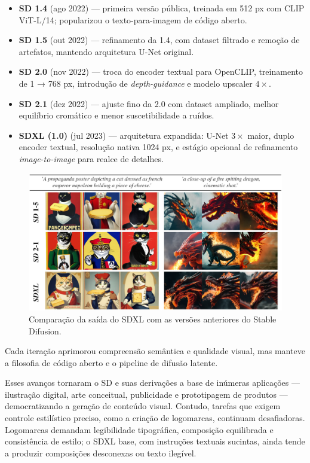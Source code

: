 \documentclass[12pt, %
openright, 
oneside, %
a4paper,    %
brazil]{facom-ufu-abntex2}
\begin{document}
\begin{itemize}
  \item \textbf{SD 1.4} (ago 2022) — primeira versão pública, treinada em 512 px com CLIP ViT-L/14; popularizou o texto-para-imagem de código aberto.  
  \item \textbf{SD 1.5} (out 2022) — refinamento da 1.4, com dataset filtrado e remoção de artefatos, mantendo arquitetura U-Net original.  
  \item \textbf{SD 2.0} (nov 2022) — troca do encoder textual para OpenCLIP, treinamento de 1 → 768 px, introdução de \emph{depth-guidance} e modelo upscaler \(4\times\).  
  \item \textbf{SD 2.1} (dez 2022) — ajuste fino da 2.0 com dataset ampliado, melhor equilíbrio cromático e menor suscetibilidade a ruídos.  
  \item \textbf{SDXL (1.0)} (jul 2023) — arquitetura expandida: U-Net \(3\times\) maior, duplo encoder textual, resolução nativa 1024 px, e estágio opcional de refinamento \emph{image-to-image} para realce de detalhes. \cite{podell2023sdxlimprovinglatentdiffusion}
\end{itemize}

\begin{figure}[H]
    \centering
	\includegraphics[width=0.85\linewidth]{figuras/comparison-sd-1.png}
	\caption[Comparação de versões do Stable Difusion]{Comparação da saída do SDXL com as versões anteriores do Stable Difusion.}
	\label{fig:comparisonSd1}
\end{figure}

Cada iteração aprimorou compreensão semântica e qualidade visual, mas manteve a filosofia de código aberto e o pipeline de difusão latente.

Esses avanços tornaram o SD e suas derivações a base de inúmeras aplicações — ilustração digital, arte conceitual, publicidade e prototipagem de produtos — democratizando a geração de conteúdo visual. Contudo, tarefas que exigem controle estilístico preciso, como a criação de logomarcas, continuam desafiadoras. Logomarcas demandam legibilidade tipográfica, composição equilibrada e consistência de estilo; o SDXL base, com instruções textuais sucintas, ainda tende a produzir composições desconexas ou texto ilegível.
\end{document}
